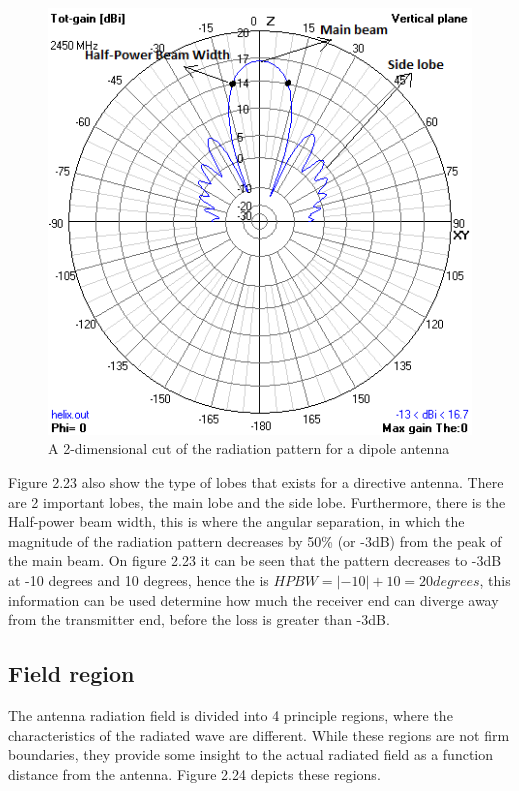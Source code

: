 \begin{figure}[h]
\centering
\includegraphics[scale=0.7]{figures/HelixVerticalrad.PNG}
\caption{A 2-dimensional cut of the radiation pattern for a dipole antenna }
\end{figure}

Figure 2.23 also show the type of lobes that exists for a directive antenna. There are 2 important lobes, the main lobe and the side lobe. Furthermore, there is the Half-power beam width, this is where the angular separation, in which the magnitude of the radiation pattern decreases by 50\% (or -3dB) from the peak of the main beam. On figure 2.23 it can be seen that the pattern decreases to -3dB at -10 degrees and 10 degrees, hence the is $HPBW = |-10|+10 =20 degrees$, this information can be used determine how much the receiver end can diverge away from the transmitter end, before the loss is greater than -3dB. 

\subsection{Field region}
The antenna radiation field is divided into 4 principle regions, where the characteristics of the radiated wave are different. While these regions are not firm boundaries, they provide some insight to the actual radiated field as a function distance from the antenna. Figure 2.24 depicts these regions.

